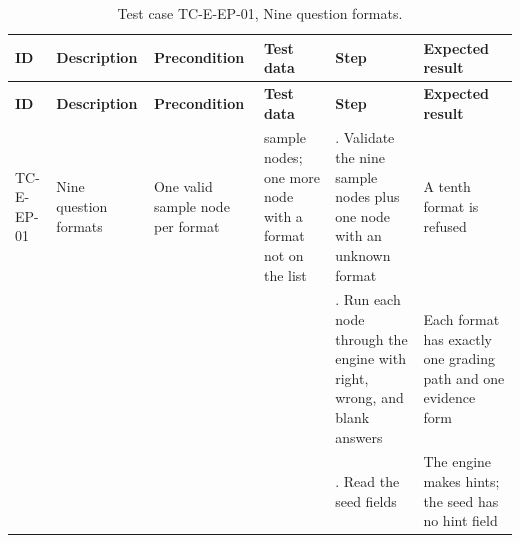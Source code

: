 {\footnotesize{}\renewcommand{\arraystretch}{1.1}
\begin{longtable}{|>{\raggedright\arraybackslash}p{}|>{\raggedright\arraybackslash}p{}|>{\raggedright\arraybackslash}p{}|>{\raggedright\arraybackslash}p{}|>{\raggedright\arraybackslash}p{}|>{\raggedright\arraybackslash}p{}|}
\caption{Test case TC-E-EP-01, Nine question formats.} \\
\hline
\textbf{ID} & \textbf{Description} & \textbf{Precondition} & \textbf{Test data} & \textbf{Step} & \textbf{Expected result} \\ \hline
\endfirsthead
\hline
\textbf{ID} & \textbf{Description} & \textbf{Precondition} & \textbf{Test data} & \textbf{Step} & \textbf{Expected result} \\ \hline
\endhead
TC-E-EP-01 & Nine question formats & One valid sample node per format & 9 sample nodes; one more node with a format not on the list & 1. Validate the nine sample nodes plus one node with an unknown format & A tenth format is refused \\ \cline{5-6}
 &  &  &  & 2. Run each node through the engine with right, wrong, and blank answers & Each format has exactly one grading path and one evidence form \\ \cline{5-6}
 &  &  &  & 3. Read the seed fields & The engine makes hints; the seed has no hint field \\ \hline
\end{longtable}
}

